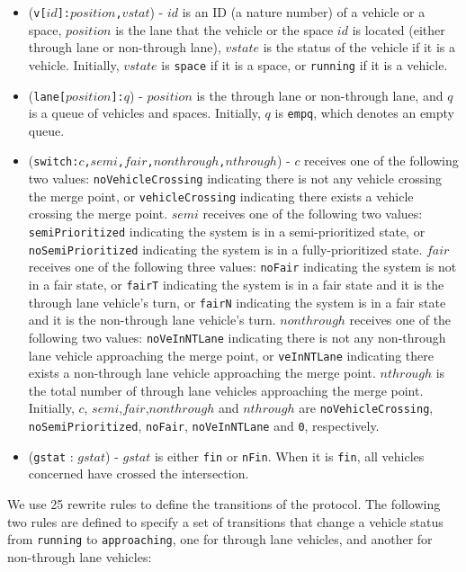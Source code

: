 \documentclass[10pt, conference, compsocconf]{IEEEtran}
\begin{document}
\begin{itemize}
    \item (\verb!v[!$id$\verb!]:!$position$\verb!,!$vstat$) - $id$ is an ID (a nature number) of a vehicle or a space, $position$ is the lane that the vehicle or the space $id$ is located (either through lane or non-through lane), $vstate$ is the status of the vehicle if it is a vehicle. Initially, $vstate$ is \verb!space! if it is a space, or \verb!running! if it is a vehicle.
    \item (\verb!lane[!$position$\verb!]:!$q$) - $position$ is the through lane or non-through lane, and $q$ is a queue of vehicles and spaces. Initially, $q$ is \verb!empq!, which denotes an empty queue.
    \item (\verb!switch:!$c$\verb!,!$semi$\verb!,!$fair$\verb!,!$nonthrough$\verb!,!$nthrough$) - $c$ receives one of the following two values: \verb!noVehicleCrossing! indicating there is not any vehicle crossing the merge point, or \verb!vehicleCrossing! indicating there exists a vehicle crossing the merge point.
    $semi$ receives one of the following two values: \verb!semiPrioritized! indicating the system is in a semi-prioritized state, or \verb!noSemiPrioritized! indicating the system is in a fully-prioritized state. 
    $fair$ receives one of the following three values: \verb!noFair! indicating the system is not in a fair state, or \verb!fairT! indicating the system is in a fair state and it is the through lane vehicle's turn, or \verb!fairN! indicating the system is in a fair state and it is the non-through lane vehicle's turn.
    $nonthrough$ receives one of the following two values: \verb!noVeInNTLane! indicating there is not any non-through lane vehicle approaching the merge point, or \verb!veInNTLane! indicating there exists a non-through lane vehicle approaching the merge point. 
    $nthrough$ is the total number of through lane vehicles approaching the merge point.
    Initially, $c$, $semi$,$fair$,$nonthrough$ and $nthrough$ are \verb!noVehicleCrossing!, \verb!noSemiPrioritized!, \verb!noFair!, \verb!noVeInNTLane! and \verb!0!, respectively.
    \item (\verb!gstat! : $gstat$) -  $gstat$ is either \verb!fin! or \verb!nFin!.
	When it is \verb!fin!, all vehicles concerned have crossed the intersection.
\end{itemize}

We use 25 rewrite rules to define the transitions of the protocol.
The following two rules are defined to specify a set of transitions that
change a vehicle status from \verb!running! to \verb!approaching!, one for through lane vehicles, and another for non-through lane vehicles: 
\end{document}
